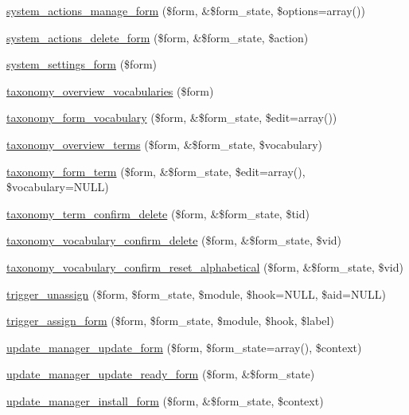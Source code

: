 \begin{DoxyCompactItemize}
\item 
\hyperlink{group__forms_gaa4836604ff53f110b7305b227cfb6344}{system\_\-actions\_\-manage\_\-form} (\$form, \&\$form\_\-state, \$options=array())
\item 
\hyperlink{group__forms_ga50d446212b0733af3d5248645233889b}{system\_\-actions\_\-delete\_\-form} (\$form, \&\$form\_\-state, \$action)
\item 
\hyperlink{group__forms_ga6fb270d34465d846cd4659a85d3e40c8}{system\_\-settings\_\-form} (\$form)
\item 
\hyperlink{group__forms_ga4509184b09d51fc6f3cccbd883cbd4f8}{taxonomy\_\-overview\_\-vocabularies} (\$form)
\item 
\hyperlink{group__forms_gafb93f170208a8c9c125b31ac91e1f966}{taxonomy\_\-form\_\-vocabulary} (\$form, \&\$form\_\-state, \$edit=array())
\item 
\hyperlink{group__forms_gac5a4ddd2115e830118c10b98f464a4ab}{taxonomy\_\-overview\_\-terms} (\$form, \&\$form\_\-state, \$vocabulary)
\item 
\hyperlink{group__forms_gadd038edd60ebd00177106bb97841803c}{taxonomy\_\-form\_\-term} (\$form, \&\$form\_\-state, \$edit=array(), \$vocabulary=NULL)
\item 
\hyperlink{group__forms_gabdfecf623fb2fe428cb6401de1375662}{taxonomy\_\-term\_\-confirm\_\-delete} (\$form, \&\$form\_\-state, \$tid)
\item 
\hyperlink{group__forms_gaa1e0e524fc8e3642b059c8186a4cd4f8}{taxonomy\_\-vocabulary\_\-confirm\_\-delete} (\$form, \&\$form\_\-state, \$vid)
\item 
\hyperlink{group__forms_ga3af4162d583df90dc6511e82d25bf374}{taxonomy\_\-vocabulary\_\-confirm\_\-reset\_\-alphabetical} (\$form, \&\$form\_\-state, \$vid)
\item 
\hyperlink{group__forms_ga0ffa8d4daef7b89cd984be08c612856b}{trigger\_\-unassign} (\$form, \$form\_\-state, \$module, \$hook=NULL, \$aid=NULL)
\item 
\hyperlink{group__forms_gab1bcec33dbc9ec1071f889662dfca03c}{trigger\_\-assign\_\-form} (\$form, \$form\_\-state, \$module, \$hook, \$label)
\item 
\hyperlink{group__forms_ga0fa2e185b0bcbac10f995d964a199c65}{update\_\-manager\_\-update\_\-form} (\$form, \$form\_\-state=array(), \$context)
\item 
\hyperlink{group__forms_gab1105c1314e1bd8822eef3cb16f78b26}{update\_\-manager\_\-update\_\-ready\_\-form} (\$form, \&\$form\_\-state)
\item 
\hyperlink{group__forms_ga5905518e0d54228827271f90dcd8c5c3}{update\_\-manager\_\-install\_\-form} (\$form, \&\$form\_\-state, \$context)

\end{DoxyCompactItemize}
